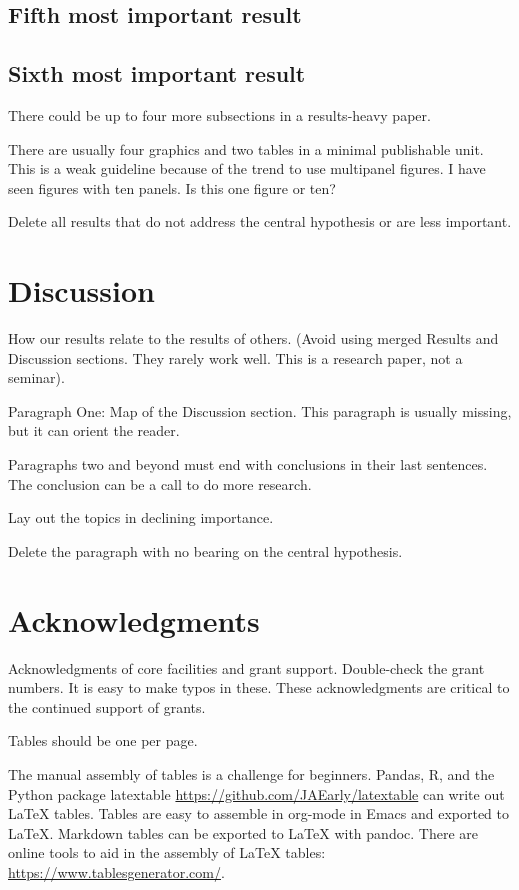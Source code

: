 \documentclass[11pt,letterpaper]{article}
\begin{document}
\subsection*{Fifth most important result}

\subsection*{Sixth most important result}

There could be up to four more subsections in a results-heavy paper.

There are usually four graphics and two tables in a minimal publishable unit.
This is a weak guideline because of the trend to use multipanel figures.
I have seen figures with ten panels.
Is this one figure or ten?

Delete all results that do not address the central hypothesis or are less important.

\section*{Discussion}
How our results relate to the results of others.
(Avoid using merged Results and Discussion sections.
They rarely work well. 
This is a research paper, not a seminar).

Paragraph One: Map of the Discussion section. 
This paragraph is usually missing, but it can orient the reader.

Paragraphs two and beyond must end with conclusions in their last sentences.
The conclusion can be a call to do more research.

Lay out the topics in declining importance.

Delete the paragraph with no bearing on the central hypothesis.


\section*{Acknowledgments}

Acknowledgments of core facilities and grant support. 
Double-check the grant numbers.
It is easy to make typos in these.
These acknowledgments are critical to the continued support of grants.




\newpage
\listoftables
Tables should be one per page. 

The manual assembly of tables is a challenge for beginners. 
Pandas, R, and the Python package latextable \url{https://github.com/JAEarly/latextable} can write out LaTeX tables. 
Tables are easy to assemble in org-mode in Emacs and exported to LaTeX. 
Markdown tables can be exported to LaTeX with pandoc. 
There are online tools to aid in the assembly of LaTeX tables: \url{https://www.tablesgenerator.com/}.
\end{document}
